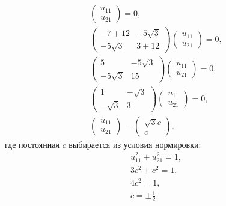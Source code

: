\begin{example}
\begin{gather*}
        \begin{pmatrix}
            u_{11} \\
            u_{21}
        \end{pmatrix}
        = 0 , \\
        \begin{pmatrix}
            -7 + 12     & -5 \sqrt{3} \\
            -5 \sqrt{3} & 3 + 12
        \end{pmatrix}
        \begin{pmatrix}
            u_{11} \\
            u_{21}
        \end{pmatrix}
        = 0 , \\
        \begin{pmatrix}
            5           & -5 \sqrt{3} \\
            -5 \sqrt{3} & 15
        \end{pmatrix}
        \begin{pmatrix}
            u_{11} \\
            u_{21}
        \end{pmatrix}
        = 0 , \\
        \begin{pmatrix}
            1          & - \sqrt{3} \\
            - \sqrt{3} & 3
        \end{pmatrix}
        \begin{pmatrix}
            u_{11} \\
            u_{21}
        \end{pmatrix}
        = 0 , \\
        \begin{pmatrix}
            u_{11} \\
            u_{21}
        \end{pmatrix}
        = \begin{pmatrix}
              \sqrt{3} c \\
              c
        \end{pmatrix} ,
    \end{gather*}
    где постоянная $c$ выбирается из условия нормировки:
    \begin{gather*}
        u_{11}^2 + u_{21}^2 = 1 , \\
        3 c^2 + c^2 = 1 , \\
        4 c^2 = 1 , \\
        c = \pm \frac{1}{2} .

\end{gather*}
\end{example}
